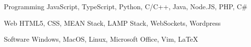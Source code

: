 


\begin{cvskills}


\cvskill
{Programming} %
{JavaScript, TypeScript, Python, C/C++, Java, Node.JS, PHP, C\#} %


\cvskill
{Web} %
{HTML5, CSS, MEAN Stack, LAMP Stack, WebSockets, Wordpress} %


\cvskill
{Software} %
{Windows, MacOS, Linux, Microsoft Office, Vim, LaTeX} %


\end{cvskills}